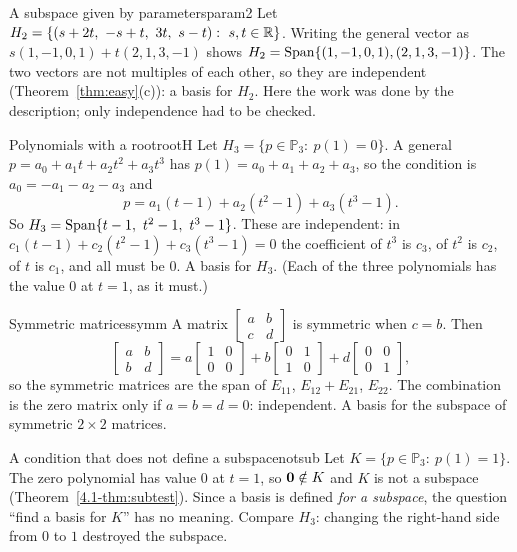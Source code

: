 \documentclass[11pt]{article}
\begin{document}
\begin{exmp}{A subspace given by parameters}{param2}
Let $H_2=\{(s+2t,\ -s+t,\ 3t,\ s-t):\ s,t\in\R\}$. Writing the general vector as $s(1,-1,0,1)+t(2,1,3,-1)$ shows $H_2=\operatorname{Span}\{(1,-1,0,1),(2,1,3,-1)\}$. The two vectors are not multiples of each other, so they are independent (Theorem~\ref{thm:easy}(c)): a basis for $H_2$. Here the work was done by the description; only independence had to be checked.
\end{exmp}

\begin{exmp}{Polynomials with a root}{rootH}
Let $H_3=\{p\in\mathbb{P}_3:\ p(1)=0\}$. A general $p=a_0+a_1t+a_2t^2+a_3t^3$ has $p(1)=a_0+a_1+a_2+a_3$, so the condition is $a_0=-a_1-a_2-a_3$ and
\[
p=a_1(t-1)+a_2(t^2-1)+a_3(t^3-1).
\]
So $H_3=\operatorname{Span}\{t-1,\ t^2-1,\ t^3-1\}$. These are independent: in $c_1(t-1)+c_2(t^2-1)+c_3(t^3-1)=0$ the coefficient of $t^3$ is $c_3$, of $t^2$ is $c_2$, of $t$ is $c_1$, and all must be $0$. A basis for $H_3$. (Each of the three polynomials has the value $0$ at $t=1$, as it must.)
\end{exmp}

\begin{exmp}{Symmetric matrices}{symm}
A matrix $\begin{bmatrix}a&b\\c&d\end{bmatrix}$ is symmetric when $c=b$. Then
\[
\begin{bmatrix}a&b\\b&d\end{bmatrix}=a\begin{bmatrix}1&0\\0&0\end{bmatrix}+b\begin{bmatrix}0&1\\1&0\end{bmatrix}+d\begin{bmatrix}0&0\\0&1\end{bmatrix},
\]
so the symmetric matrices are the span of $E_{11}$, $E_{12}+E_{21}$, $E_{22}$. The combination is the zero matrix only if $a=b=d=0$: independent. A basis for the subspace of symmetric $2\times2$ matrices.
\end{exmp}

\begin{exmp}{A condition that does not define a subspace}{notsub}
Let $K=\{p\in\mathbb{P}_3:\ p(1)=1\}$. The zero polynomial has value $0$ at $t=1$, so $\mathbf{0}\notin K$ and $K$ is not a subspace (Theorem~\ref{4.1-thm:subtest}). Since a basis is defined \emph{for a subspace}, the question ``find a basis for $K$'' has no meaning. Compare $H_3$: changing the right-hand side from $0$ to $1$ destroyed the subspace.
\end{exmp}
\end{document}
